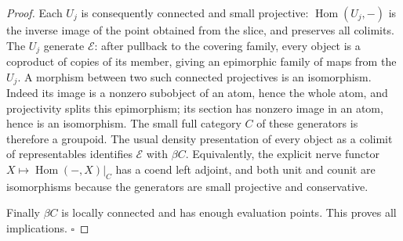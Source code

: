 \begin{proof}
Each $U_j$ is consequently connected and small projective: $\operatorname{Hom}(U_j,-)$ is the inverse image of the point obtained from the slice, and preserves all colimits. The $U_j$ generate $\mathcal E$: after pullback to the covering family, every object is a coproduct of copies of its member, giving an epimorphic family of maps from the $U_j$. A morphism between two such connected projectives is an isomorphism. Indeed its image is a nonzero subobject of an atom, hence the whole atom, and projectivity splits this epimorphism; its section has nonzero image in an atom, hence is an isomorphism. The small full category $C$ of these generators is therefore a groupoid. The usual density presentation of every object as a colimit of representables identifies $\mathcal E$ with $\beta C$. Equivalently, the explicit nerve functor $X\mapsto\operatorname{Hom}(-,X)|_C$ has a coend left adjoint, and both unit and counit are isomorphisms because the generators are small projective and conservative.

Finally $\beta C$ is locally connected and has enough evaluation points. This proves all implications. \hfill$\square$
\end{proof}

